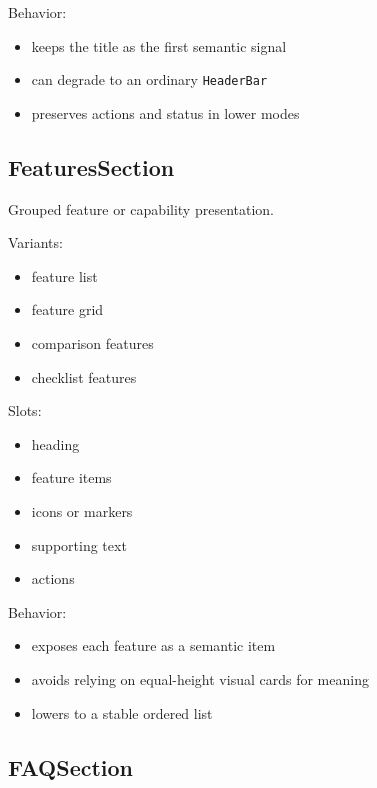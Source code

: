Behavior:

\begin{itemize}
\tightlist
\item
  keeps the title as the first semantic signal
\item
  can degrade to an ordinary \texttt{H\allowbreak{}e\allowbreak{}a\allowbreak{}d\allowbreak{}e\allowbreak{}r\allowbreak{}B\allowbreak{}a\allowbreak{}r}
\item
  preserves actions and status in lower modes
\end{itemize}

\subsection{FeaturesSection}\label{record-128-featuressection}

Grouped feature or capability presentation.

Variants:

\begin{itemize}
\tightlist
\item
  feature list
\item
  feature grid
\item
  comparison features
\item
  checklist features
\end{itemize}

Slots:

\begin{itemize}
\tightlist
\item
  heading
\item
  feature items
\item
  icons or markers
\item
  supporting text
\item
  actions
\end{itemize}

Behavior:

\begin{itemize}
\tightlist
\item
  exposes each feature as a semantic item
\item
  avoids relying on equal-height visual cards for meaning
\item
  lowers to a stable ordered list
\end{itemize}

\subsection{FAQSection}\label{record-128-faqsection}

